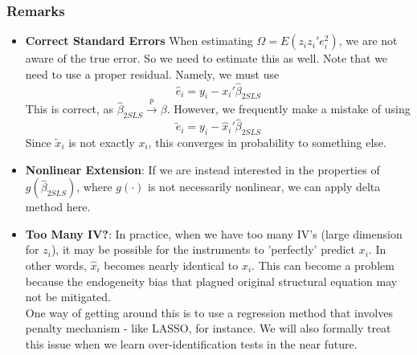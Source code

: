 \documentclass[12pt]{article}
\theoremstyle{definition}
\theoremstyle{property}
\theoremstyle{assumption}
\theoremstyle{example}
\theoremstyle{comment}
\newtheorem{comment}{Comment}[section]
\begin{document}
\subsubsection{Remarks}
\begin{itemize}
\item \textbf{Correct Standard Errors} When estimating $\Omega=E(z_iz_i'e_i^2)$, we are not aware of the true error. So we need to estimate this as well. Note that we need to use a proper residual. Namely, we must use
\[
\hat{e}_i = y_i - x_i'\hat{\beta}_{2SLS}
\]
This is correct, as $\hat{\beta}_{2SLS}\xrightarrow{p}\beta$. However, we frequently make a mistake of using
\[
\tilde{e}_i = y_i - \hat{x}_i'\hat{\beta}_{2SLS}
\]
Since $\tilde{x}_i$ is not exactly $x_i$, this converges in probability to something else. 
\begin{mdframed}[backgroundcolor=yellow!5] 
\begin{comment}[on STATA]
To see this, compare the standard errors from doing \textnormal{\texttt{ivregress 2sls y (x=z)}} and 'hard-coding' 2SLS by using \textnormal{\texttt{reg x z}}, then \textnormal{\texttt{predict xhat}}, and then coding \textnormal{\texttt{reg y xhat}}. 
\end{comment}
\end{mdframed}
\item \textbf{Nonlinear Extension}: If we are instead interested in the properties of $g(\hat{\beta}_{2SLS})$, where $g(\cdot)$ is not necessarily nonlinear, we can apply delta method here. 
\item \textbf{Too Many IV?}: In practice, when we have too many IV's (large dimension for $z_i$), it may be possible for the instruments to 'perfectly' predict $x_i$. In other words, $\hat{x}_i$ becomes nearly identical to $x_i$. This can become a problem because the endogeneity bias that plagued original structural equation may not be mitigated. \\
One way of getting around this is to use a regression method that involves penalty mechanism - like LASSO, for instance. We will also formally treat this issue when we learn over-identification tests in the near future. 
\end{itemize}
\end{document}
